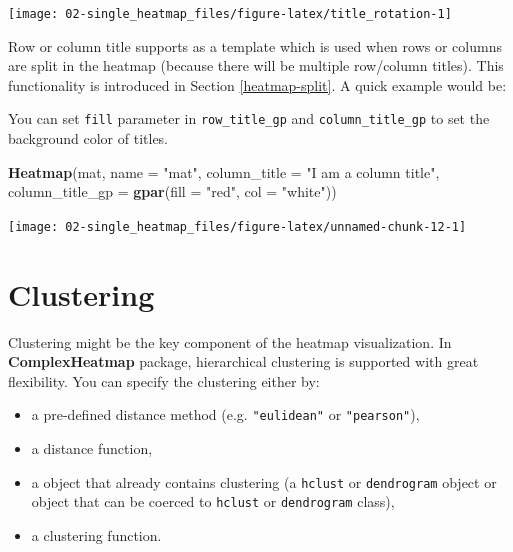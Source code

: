 \documentclass[]{book}
\newenvironment{Shaded}{\begin{snugshade}}{\end{snugshade}}
\newcommand{\KeywordTok}[1]{\textcolor[rgb]{0.13,0.29,0.53}{\textbf{#1}}}
\newcommand{\DataTypeTok}[1]{\textcolor[rgb]{0.13,0.29,0.53}{#1}}
\newcommand{\DecValTok}[1]{\textcolor[rgb]{0.00,0.00,0.81}{#1}}
\newcommand{\StringTok}[1]{\textcolor[rgb]{0.31,0.60,0.02}{#1}}
\newcommand{\CommentTok}[1]{\textcolor[rgb]{0.56,0.35,0.01}{\textit{#1}}}
\newcommand{\NormalTok}[1]{#1}
\providecommand{\tightlist}{%
  \setlength{\itemsep}{0pt}\setlength{\parskip}{0pt}}
\theoremstyle{definition}
\theoremstyle{definition}
\theoremstyle{definition}
\theoremstyle{remark}
\begin{document}
\begin{center}\texttt{[image: 02-single\_heatmap\_files/figure-latex/title\_rotation-1]} \end{center}

Row or column title supports as a template which is used when rows or
columns are split in the heatmap (because there will be multiple
row/column titles). This functionality is introduced in Section
\ref{heatmap-split}. A quick example would be:

\begin{Shaded}
\end{Shaded}

You can set \texttt{fill} parameter in \texttt{row\_title\_gp} and
\texttt{column\_title\_gp} to set the background color of titles.

\begin{Shaded}
\begin{Highlighting}[]
\KeywordTok{Heatmap}\NormalTok{(mat, }\DataTypeTok{name =} \StringTok{"mat"}\NormalTok{, }\DataTypeTok{column_title =} \StringTok{"I am a column title"}\NormalTok{, }
    \DataTypeTok{column_title_gp =} \KeywordTok{gpar}\NormalTok{(}\DataTypeTok{fill =} \StringTok{"red"}\NormalTok{, }\DataTypeTok{col =} \StringTok{"white"}\NormalTok{))}
\end{Highlighting}
\end{Shaded}

\begin{center}\texttt{[image: 02-single\_heatmap\_files/figure-latex/unnamed-chunk-12-1]} \end{center}

\section{Clustering}\label{clustering}

Clustering might be the key component of the heatmap visualization. In
\textbf{ComplexHeatmap} package, hierarchical clustering is supported
with great flexibility. You can specify the clustering either by:

\begin{itemize}
\tightlist
\item
  a pre-defined distance method (e.g. \texttt{"eulidean"} or
  \texttt{"pearson"}),
\item
  a distance function,
\item
  a object that already contains clustering (a \texttt{hclust} or
  \texttt{dendrogram} object or object that can be coerced to
  \texttt{hclust} or \texttt{dendrogram} class),
\item
  a clustering function.
\end{itemize}
\end{document}
